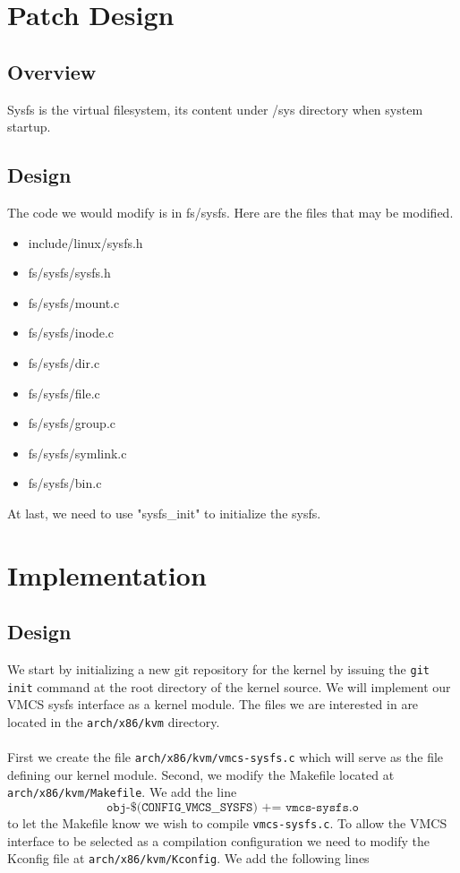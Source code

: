 \documentclass[onecolumn, draftclsnofoot,10pt, compsoc]{IEEEtran}
\begin{document}
\section{Patch Design}
    \subsection{Overview}
    Sysfs is the virtual filesystem, its content under /sys directory when system startup.
    \subsection{Design}
    The code we would modify is in fs/sysfs. Here are the files that may be modified.
    \begin{itemize}
      \item include/linux/sysfs.h
      \item fs/sysfs/sysfs.h
      \item fs/sysfs/mount.c
      \item fs/sysfs/inode.c
      \item fs/sysfs/dir.c 
      \item fs/sysfs/file.c
      \item fs/sysfs/group.c
      \item fs/sysfs/symlink.c
      \item fs/sysfs/bin.c
    \end{itemize}
    At last, we need to use "sysfs\_init" to initialize the sysfs.    
    
    \section{Implementation}
    \subsection{Design}
    We start by initializing a new git repository for the kernel by issuing the \texttt{git init} command at the root directory of the kernel source.
    We will implement our VMCS sysfs interface as a kernel module. The files we are interested in are located in the \texttt{arch/x86/kvm} directory.
    \ \\ \ \\
    First we create the file \texttt{arch/x86/kvm/vmcs-sysfs.c} which will serve as the file defining our kernel module.
    Second, we modify the Makefile located at \texttt{arch/x86/kvm/Makefile}. We add the line \[\texttt{obj-\$(CONFIG\_VMCS\_\_SYSFS) += vmcs-sysfs.o}\]
    to let the Makefile know we wish to compile \texttt{vmcs-sysfs.c}.
    To allow the VMCS interface to be selected as a compilation configuration we need to modify the Kconfig file at \texttt{arch/x86/kvm/Kconfig}. We add the following lines
    
\end{document}
